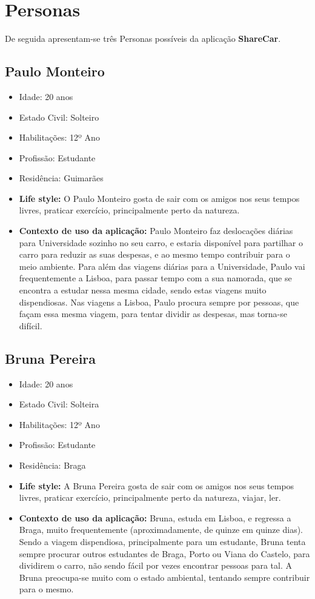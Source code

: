\section{Personas}
\hspace{5mm} De seguida apresentam-se três Personas possíveis da aplicação \textbf{ShareCar}.

\subsection{Paulo Monteiro}
\begin{itemize}
    \item Idade: 20 anos
    \item Estado Civil: Solteiro
    \item Habilitações: 12º Ano
    \item Profissão: Estudante
    \item Residência: Guimarães
    \item \textbf{Life style:} O Paulo Monteiro gosta de sair com os amigos nos seus tempos livres, praticar exercício, principalmente perto da natureza.
    \item \textbf{Contexto de uso da aplicação:} Paulo Monteiro faz deslocações diárias para Universidade sozinho no seu carro, e estaria disponível para partilhar o carro para reduzir as suas despesas, e ao mesmo tempo contribuir para o meio ambiente. Para além das viagens diárias para a Universidade, Paulo vai frequentemente a Lisboa, para passar tempo com a sua namorada, que se encontra a estudar nessa mesma cidade, sendo estas viagens muito dispendiosas. Nas viagens a Lisboa, Paulo procura sempre por pessoas, que façam essa mesma viagem, para tentar dividir as despesas, mas torna-se difícil.
\end{itemize}{}

\subsection{Bruna Pereira}
\begin{itemize}
    \item Idade: 20 anos
    \item Estado Civil: Solteira
    \item Habilitações: 12º Ano
    \item Profissão: Estudante
    \item Residência: Braga
    \item \textbf{Life style:} A Bruna Pereira gosta de sair com os amigos nos seus tempos livres, praticar exercício, principalmente perto da natureza, viajar, ler.
    \item \textbf{Contexto de uso da aplicação:} Bruna, estuda em Lisboa, e regressa a Braga, muito frequentemente (aproximadamente, de quinze em quinze dias). Sendo a viagem dispendiosa, principalmente para um estudante, Bruna tenta sempre procurar outros estudantes de Braga, Porto ou Viana do Castelo, para dividirem o carro, não sendo fácil por vezes encontrar pessoas para tal. A Bruna preocupa-se muito com o estado ambiental, tentando sempre contribuir para o mesmo.
\end{itemize}{}

